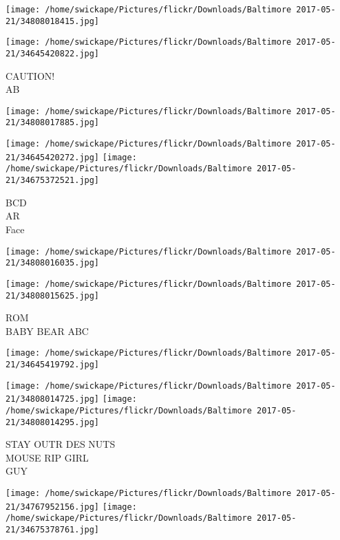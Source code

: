 \documentclass[10pt,letterpaper]{article}
\begin{document}
\texttt{[image: /home/swickape/Pictures/flickr/Downloads/Baltimore 2017-05-21/34808018415.jpg]}

\vspace{0.25in}
\texttt{[image: /home/swickape/Pictures/flickr/Downloads/Baltimore 2017-05-21/34645420822.jpg]}

CAUTION!\\
AB\\
\pagebreak

\texttt{[image: /home/swickape/Pictures/flickr/Downloads/Baltimore 2017-05-21/34808017885.jpg]}

\vspace{0.25in}
\texttt{[image: /home/swickape/Pictures/flickr/Downloads/Baltimore 2017-05-21/34645420272.jpg]}
\texttt{[image: /home/swickape/Pictures/flickr/Downloads/Baltimore 2017-05-21/34675372521.jpg]}

BCD\\
AR\\
Face\\
\pagebreak

\texttt{[image: /home/swickape/Pictures/flickr/Downloads/Baltimore 2017-05-21/34808016035.jpg]}

\vspace{0.25in}
\texttt{[image: /home/swickape/Pictures/flickr/Downloads/Baltimore 2017-05-21/34808015625.jpg]}

ROM\\
BABY BEAR ABC\\
\pagebreak

\texttt{[image: /home/swickape/Pictures/flickr/Downloads/Baltimore 2017-05-21/34645419792.jpg]}

\vspace{0.25in}
\texttt{[image: /home/swickape/Pictures/flickr/Downloads/Baltimore 2017-05-21/34808014725.jpg]}
\texttt{[image: /home/swickape/Pictures/flickr/Downloads/Baltimore 2017-05-21/34808014295.jpg]}

STAY OUTR DES NUTS\\
MOUSE RIP GIRL\\
GUY\\
\pagebreak

\texttt{[image: /home/swickape/Pictures/flickr/Downloads/Baltimore 2017-05-21/34767952156.jpg]}
\texttt{[image: /home/swickape/Pictures/flickr/Downloads/Baltimore 2017-05-21/34675378761.jpg]}
\end{document}
